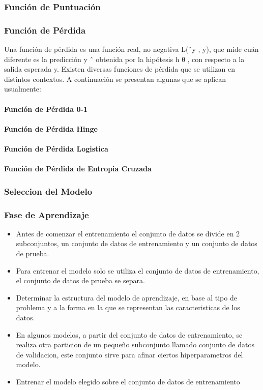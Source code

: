 \documentclass[a4paper,11pt,spanish]{book}
\begin{document}
	\subsubsection{Función de Puntuación}
	
	\subsubsection{Función de Pérdida}
	  Una función de pérdida es una función real, no negativa L(ˆy , y), que mide cuán diferente es la predicción y ˆ obtenida por la hipótesis h θ , con respecto a la
	  salida esperada y. Existen diversas funciones de pérdida que se utilizan en distintos contextos. A continuación se presentan algunas que se aplican usualmente:
	  \paragraph{Función de Pérdida 0-1}
	  \paragraph{Función de Pérdida Hinge}
	  \paragraph{Función de Pérdida Logistica}
	  \paragraph{Función de Pérdida de Entropia Cruzada}

	\subsubsection {Seleccion del Modelo}
	
	\subsubsection {Fase de Aprendizaje}
	  \begin{itemize}
	    \item Antes de comenzar el entrenamiento el conjunto de datos se divide en 2 subconjuntos, un conjunto de datos de entrenamiento y un conjunto de datos de prueba. 
	    \item Para entrenar el modelo solo se utiliza el conjunto de datos de entrenamiento, el conjunto de datos de prueba se separa.
	    \item Determinar la estructura del modelo de aprendizaje, en base al tipo de problema y a la forma en la que se representan las caracteristicas de los datos.
	    \item En algunos modelos, a partir del conjunto de datos de entrenamiento, se realiza otra particion de un pequeño subconjunto llamado conjunto de datos de validacion, este conjunto sirve 
	    para afinar ciertos hiperparametros del modelo.
	    \item Entrenar el modelo elegido sobre el conjunto de datos de entrenamiento
	  \end{itemize}
	
\end{document}
